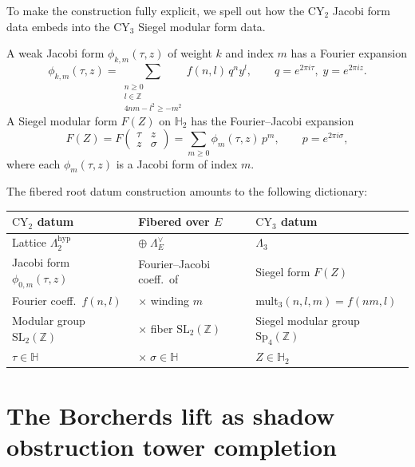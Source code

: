 \documentclass[11pt]{article}
\theoremstyle{plain}
\theoremstyle{definition}
\theoremstyle{remark}
\newcommand{\CY}{\mathrm{CY}}
\begin{document}
To make the construction fully explicit, we spell out how the $\CY_2$ Jacobi
form data embeds into the $\CY_3$ Siegel modular form data.

A weak Jacobi form $\phi_{k,m}(\tau, z)$ of weight $k$ and index $m$ has a
Fourier expansion
\[
 \phi_{k,m}(\tau, z) = \sum_{\substack{n \geq 0 \\ l \in \mathbb{Z} \\ 4nm - l^2 \geq -m^2}} f(n, l) \, q^n y^l,
 \qquad q = e^{2\pi i \tau}, \; y = e^{2\pi i z}.
\]
A Siegel modular form $F(Z)$ on $\mathbb{H}_2$ has the Fourier--Jacobi expansion
\begin{equation}\label{eq:fourier-jacobi}
 F(Z) = F\!\begin{pmatrix} \tau & z \\ z & \sigma \end{pmatrix}
 = \sum_{m \geq 0} \phi_m(\tau, z) \, p^m,
 \qquad p = e^{2\pi i \sigma},
\end{equation}
where each $\phi_m(\tau, z)$ is a Jacobi form of index $m$.

The fibered root datum construction amounts to the following dictionary:

\begin{center}
\begin{tabular}{lll}
\textbf{$\CY_2$ datum} & \textbf{Fibered over $E$} & \textbf{$\CY_3$ datum} \\
\hline
Lattice $\Lambda_2^{\mathrm{hyp}}$ & $\oplus \; \Lambda_E^\vee$ & $\Lambda_3$ \\
Jacobi form $\phi_{0,m}(\tau, z)$ & Fourier--Jacobi coeff.\ of & Siegel form $F(Z)$ \\
Fourier coeff.\ $f(n, l)$ & $\times$ winding $m$ & mult$_3(n,l,m) = f(nm,l)$ \\
Modular group $\mathrm{SL}_2(\mathbb{Z})$ & $\times$ fiber $\mathrm{SL}_2(\mathbb{Z})$ & Siegel modular group $\mathrm{Sp}_4(\mathbb{Z})$ \\
$\tau \in \mathbb{H}$ & $\times \; \sigma \in \mathbb{H}$ & $Z \in \mathbb{H}_2$
\end{tabular}
\end{center}

\section{The Borcherds lift as shadow obstruction tower completion}
\label{sec:fib-borcherds}
\end{document}
